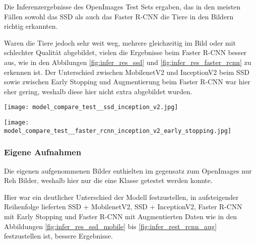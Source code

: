 Die Inferenzergebnisse des OpenImages Test Sets 
ergaben, das in den meisten Fällen sowohl das SSD
als auch das Faster R-CNN die Tiere in den Bildern 
richtig erkannten.

Waren die Tiere jedoch sehr weit weg, mehrere gleichzeitig im Bild 
oder mit schlechter Qualität abgebildet,
vielen die Ergebnisse beim Faster R-CNN besser aus, wie in 
den Abbilungen \ref{fig:infer_res_ssd} und \ref{fig:infer_res_faster_rcnn}
zu erkennen ist.
Der Unterschied zwischen MobilenetV2 und InceptionV2 beim SSD 
sowie zwischen Early Stopping und Augmentierung beim Faster R-CNN 
war hier eher gering, weshalb diese hier nicht extra abgebildet 
wurden.

\vspace{1cm}


\begin{minipage}{0.5\textwidth}
  \centering
  \texttt{[image: model\_compare\_test\_\_ssd\_inception\_v2.jpg]}
  \label{fig:infer_res_ssd}
\end{minipage}
\begin{minipage}{0.5\textwidth}
  \centering
  \texttt{[image: model\_compare\_test\_\_faster\_rcnn\_inception\_v2\_early\_stopping.jpg]}
  \label{fig:infer_res_faster_rcnn}
\end{minipage}


\subsubsection{Eigene Aufnahmen}

Die eigenen aufgenommenen Bilder enthielten im 
gegensatz zum OpenImages nur Reh Bilder, weshalb 
hier nur die eine Klasse getestet werden konnte.

Hier war ein deutlicher Unterschied der Modell festzustellen, 
in aufsteigender Reihenfolge lieferten SSD + MobilenetV2,
SSD + InceptionV2, Faster R-CNN mit 
Early Stopping und Faster R-CNN mit Augmentierten Daten
wie in den Abbildungen \ref{fig:infer_res_ssd_mobile}
bis \ref{fig:infer_rest_rcnn_aug} festzustellen ist, 
bessere Ergebnisse.


